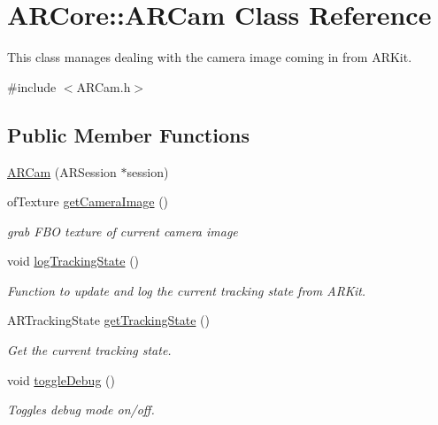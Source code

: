 \hypertarget{class_a_r_core_1_1_a_r_cam}{}\section{A\+R\+Core\+:\+:A\+R\+Cam Class Reference}
\label{class_a_r_core_1_1_a_r_cam}


This class manages dealing with the camera image coming in from A\+R\+Kit.  




{\ttfamily \#include $<$A\+R\+Cam.\+h$>$}

\subsection*{Public Member Functions}
\begin{DoxyCompactItemize}
\item 
\hyperlink{class_a_r_core_1_1_a_r_cam_aac3da0758960b1cc5787eae0b7efffe1}{A\+R\+Cam} (A\+R\+Session $\ast$session)
\item 
of\+Texture \hyperlink{class_a_r_core_1_1_a_r_cam_a7e0e81c2a201955219364f5e3f1b1915}{get\+Camera\+Image} ()
\begin{DoxyCompactList}\small\item\em grab F\+BO texture of current camera image \end{DoxyCompactList}\item 
void \hyperlink{class_a_r_core_1_1_a_r_cam_aea3513907e5805e6bffb08b7d65c0fc7}{log\+Tracking\+State} ()
\begin{DoxyCompactList}\small\item\em Function to update and log the current tracking state from A\+R\+Kit. \end{DoxyCompactList}\item 
A\+R\+Tracking\+State \hyperlink{class_a_r_core_1_1_a_r_cam_abef41c0e5914cb2404b26317921d16a1}{get\+Tracking\+State} ()
\begin{DoxyCompactList}\small\item\em Get the current tracking state. \end{DoxyCompactList}\item 
void \hyperlink{class_a_r_core_1_1_a_r_cam_ad32236d8551ac38943f088f16afb8002}{toggle\+Debug} ()
\begin{DoxyCompactList}\small\item\em Toggles debug mode on/off. \end{DoxyCompactList}\item 

\end{DoxyCompactItemize}
